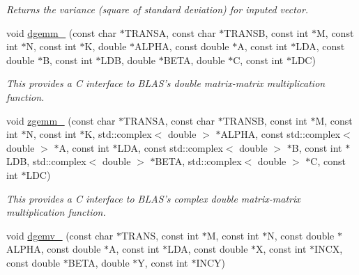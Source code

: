 \begin{DoxyCompactItemize}
\begin{DoxyCompactList}\small\item\em Returns the variance (square of standard deviation) for inputed vector. \end{DoxyCompactList}\item 
\hypertarget{namespacekeycpp_a16b58f47ed977cafdc96227468f5f10a}{void \hyperlink{namespacekeycpp_a16b58f47ed977cafdc96227468f5f10a}{dgemm\-\_\-} (const char $\ast$T\-R\-A\-N\-S\-A, const char $\ast$T\-R\-A\-N\-S\-B, const int $\ast$M, const int $\ast$N, const int $\ast$K, double $\ast$A\-L\-P\-H\-A, const double $\ast$A, const int $\ast$L\-D\-A, const double $\ast$B, const int $\ast$L\-D\-B, double $\ast$B\-E\-T\-A, double $\ast$C, const int $\ast$L\-D\-C)}\label{namespacekeycpp_a16b58f47ed977cafdc96227468f5f10a}

\begin{DoxyCompactList}\small\item\em This provides a C interface to B\-L\-A\-S's double matrix-\/matrix multiplication function. \end{DoxyCompactList}\item 
\hypertarget{namespacekeycpp_a29fb4e46ee1b9cce0fd8bc79a2490c72}{void \hyperlink{namespacekeycpp_a29fb4e46ee1b9cce0fd8bc79a2490c72}{zgemm\-\_\-} (const char $\ast$T\-R\-A\-N\-S\-A, const char $\ast$T\-R\-A\-N\-S\-B, const int $\ast$M, const int $\ast$N, const int $\ast$K, std\-::complex$<$ double $>$ $\ast$A\-L\-P\-H\-A, const std\-::complex$<$ double $>$ $\ast$A, const int $\ast$L\-D\-A, const std\-::complex$<$ double $>$ $\ast$B, const int $\ast$L\-D\-B, std\-::complex$<$ double $>$ $\ast$B\-E\-T\-A, std\-::complex$<$ double $>$ $\ast$C, const int $\ast$L\-D\-C)}\label{namespacekeycpp_a29fb4e46ee1b9cce0fd8bc79a2490c72}

\begin{DoxyCompactList}\small\item\em This provides a C interface to B\-L\-A\-S's complex double matrix-\/matrix multiplication function. \end{DoxyCompactList}\item 
\hypertarget{namespacekeycpp_af0676a4a89dbb63f09fc627c05e12699}{void \hyperlink{namespacekeycpp_af0676a4a89dbb63f09fc627c05e12699}{dgemv\-\_\-} (const char $\ast$T\-R\-A\-N\-S, const int $\ast$M, const int $\ast$N, const double $\ast$A\-L\-P\-H\-A, const double $\ast$A, const int $\ast$L\-D\-A, const double $\ast$X, const int $\ast$I\-N\-C\-X, const double $\ast$B\-E\-T\-A, double $\ast$Y, const int $\ast$I\-N\-C\-Y)}\label{namespacekeycpp_af0676a4a89dbb63f09fc627c05e12699}


\end{DoxyCompactItemize}
